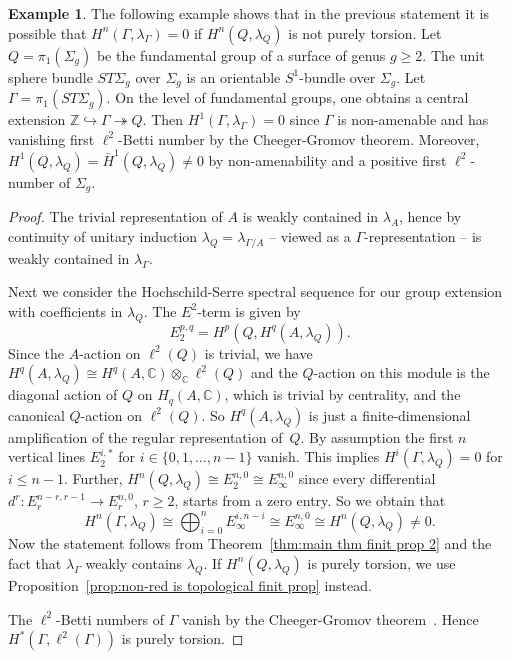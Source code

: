 \documentclass[12pt,reqno]{amsart}
\newcommand{\Z}{\mathbb{Z}}
\newcommand{\C}{\mathbb{C}}
\theoremstyle{definition}
\newtheorem{example}[theorem]{Example}
\begin{document}
\begin{example}
The following example shows that in the previous statement it is possible that $H^n(\Gamma, \lambda_\Gamma)=0$ if $H^n(Q, \lambda_Q)$ is not purely torsion. 
Let $Q=\pi_1(\Sigma_g)$ be the fundamental group of a surface of genus $g\ge 2$. The unit sphere bundle $ST\Sigma_g$ over $\Sigma_g$ is an orientable $S^1$-bundle over $\Sigma_g$. Let $\Gamma=\pi_1(ST\Sigma_g)$. On the level of fundamental groups, one obtains a central extension $\Z\hookrightarrow \Gamma\twoheadrightarrow Q$. Then $H^1(\Gamma, \lambda_\Gamma)=0$ since $\Gamma$ is non-amenable and has vanishing first $\ell^2$-Betti number by the Cheeger-Gromov theorem. Moreover, $H^1(Q,\lambda_Q)=\bar H^1(Q, \lambda_Q)\ne 0$ by non-amenability and a positive first $\ell^2$-number of $\Sigma_g$. 
\end{example}

\begin{proof}
The trivial representation of $A$ is weakly contained in $\lambda_A$, hence by continuity of unitary induction $\lambda_Q=\lambda_{\Gamma/A}$ -- viewed as a $\Gamma$-representation -- is weakly contained in $\lambda_{\Gamma}$. 

Next we consider the Hochschild-Serre spectral sequence for our group extension with coefficients in $\lambda_Q$. 
The $E^2$-term is given by 
\[
E_2^{p,q}=H^p(Q, H^q(A, \lambda_Q)).
\]	
Since the $A$-action on $\ell^2(Q)$ is trivial, we have 
$H^q(A, \lambda_Q)\cong H^q(A,\C)\otimes_\C \ell^2(Q)$ and the $Q$-action on this module is the diagonal action of $Q$ on $H_q(A,\C)$, which is trivial by centrality, and the canonical $Q$-action on $\ell^2(Q)$. So $H^q(A,\lambda_Q)$ is just a finite-dimensional amplification of the regular representation of~$Q$. 
By assumption the first $n$ vertical lines $E_2^{i,\ast}$ for $i\in\{0,1,\dots, n-1\}$ vanish. 
This implies $H^i(\Gamma, \lambda_Q)=0$ for $i\le n-1$. Further, 
$H^n(Q, \lambda_Q)\cong E_2^{n,0}\cong E_\infty^{n,0}$ since every differential $d^r\colon E_r^{n-r,r-1}\to E_r^{n,0}$, $r\ge 2$, starts from a zero entry. 
So we obtain that 
\[H^n(\Gamma, \lambda_Q)\cong \bigoplus_{i=0}^n E_\infty^{i, n-i}\cong E_\infty^{n,0}\cong H^n(Q,\lambda_Q)\ne 0.\]
Now the statement follows from Theorem~\ref{thm:main thm finit prop 2} and the fact that $\lambda_\Gamma$ weakly contains $\lambda_Q$. If $H^n(Q,\lambda_Q)$ is purely torsion, we use Proposition~\ref{prop:non-red is topological finit prop} instead. 

The $\ell^2$-Betti numbers of $\Gamma$ vanish by the Cheeger-Gromov theorem~\cite[Corollary~6.75 on p.~275]{LuckBook}. Hence $H^\ast(\Gamma, \ell^2(\Gamma))$ is purely torsion. 
\end{proof}
\end{document}
